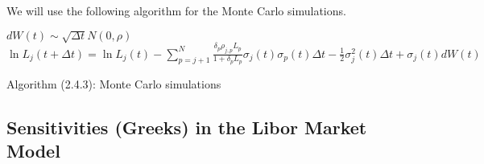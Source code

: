 \documentclass[11pt]{article}
\numberwithin{equation}{subsection}
\begin{document}
\newpage
We will use the following algorithm for the Monte Carlo simulations.
\begin{algorithmic}
	\STATE \(dW(t) \sim \sqrt{\Delta t} N(0, \rho) \)
	\STATE \(\ln L_j(t+\Delta t) = \ln L_j(t) - \sum_{p=j+1}^{N} \frac{\delta_{p} \rho_{j, p} L_p}{1 + \delta_{p}L_p} \sigma_{j}(t) \sigma_{p}(t) \Delta t - \frac{1}{2} \sigma_{j}^{2}(t) \Delta t + \sigma_{j}(t) dW(t) \)
	\ENDFOR			
	\ENDFOR	
	\ENDFOR
\end{algorithmic}
	\begin{center}
	Algorithm (2.4.3): Monte Carlo simulations
\end{center}	

\subsection{Sensitivities (Greeks) in the Libor Market Model}
\end{document}
